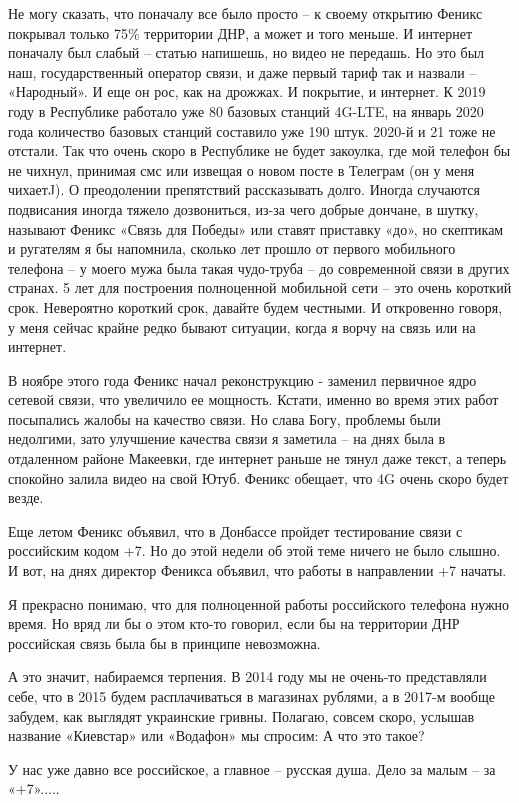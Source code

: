 
Не могу сказать, что поначалу все было просто – к своему открытию Феникс
покрывал только 75\% территории ДНР, а может и того меньше. И интернет поначалу
был слабый – статью напишешь, но видео не передашь. Но это был наш,
государственный оператор связи, и даже первый тариф так и назвали – «Народный».
И еще он рос, как на дрожжах. И покрытие, и интернет. К 2019 году в Республике
работало уже 80 базовых станций 4G-LTE, на январь 2020 года количество базовых
станций составило уже 190 штук. 2020-й и 21 тоже не отстали. Так что очень
скоро в Республике не будет закоулка, где мой телефон бы не чихнул, принимая
смс или извещая о новом посте в Телеграм (он у меня чихаетJ). О преодолении
препятствий рассказывать долго. Иногда случаются подвисания иногда тяжело
дозвониться, из-за чего добрые дончане, в шутку, называют Феникс «Связь для
Победы» или ставят приставку «до», но скептикам и ругателям я бы напомнила,
сколько лет прошло от первого мобильного телефона – у моего мужа была такая
чудо-труба – до современной связи в других странах. 5 лет для построения
полноценной мобильной сети – это очень короткий срок. Невероятно короткий срок,
давайте будем честными. И откровенно говоря, у меня сейчас крайне редко бывают
ситуации, когда я ворчу на связь или на интернет.


В ноябре этого года Феникс начал реконструкцию - заменил первичное ядро сетевой
связи, что увеличило ее мощность. Кстати, именно во время этих работ посыпались
жалобы на качество связи. Но слава Богу, проблемы были недолгими, зато
улучшение качества связи я заметила – на днях была в отдаленном районе
Макеевки, где интернет раньше не тянул даже текст, а теперь спокойно залила
видео на свой Ютуб. Феникс обещает, что 4G очень скоро будет везде.


Еще летом Феникс объявил, что в Донбассе пройдет тестирование связи с
российским кодом +7. Но до этой недели об этой теме ничего не было слышно. И
вот, на днях директор Феникса объявил, что работы в направлении +7 начаты.

Я прекрасно понимаю, что для полноценной работы российского телефона нужно
время. Но вряд ли бы о этом кто-то говорил, если бы на территории ДНР
российская связь была бы в принципе невозможна.

А это значит, набираемся терпения. В 2014 году мы не очень-то представляли
себе, что в 2015 будем расплачиваться в магазинах рублями, а в 2017-м вообще
забудем, как выглядят украинские гривны. Полагаю, совсем скоро, услышав
название «Киевстар» или «Водафон» мы спросим: А что это такое?

У нас уже давно все российское, а главное – русская душа. Дело за малым – за
«+7».....
